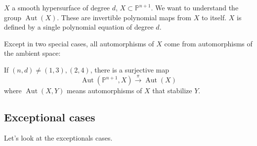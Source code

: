 $X$ a smooth hypersurface of degree $d $, $X\subset \mathbb{P}^{n+1}$. We want to understand the group $\operatorname{Aut}(X)$. These are invertible polynomial maps from $X$ to itself. $X$ is defined by a single polynomial equation of degree $d$.

\begin{thm}\leavevmode
	Except in two special cases, all automorphisms of $X$ come from automorphisms of the ambient space:
	
	If $(n,d)\neq (1,3),(2,4)$, there is a surjective map
	\[\operatorname{Aut}(\mathbb{P}^{n+1},X)\overset{\pi}{\longrightarrow}\operatorname{Aut}(X)\]
	where $\operatorname{Aut}(X,Y)$ means automorphisms of $X$ that stabilize  $Y$.
\end{thm}

\subsection{Exceptional cases}

Let's look at the exceptionals cases.

